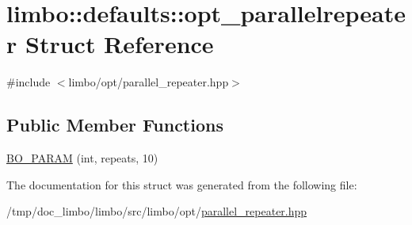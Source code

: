 \hypertarget{structlimbo_1_1defaults_1_1opt__parallelrepeater}{}\section{limbo\+:\+:defaults\+:\+:opt\+\_\+parallelrepeater Struct Reference}
\label{structlimbo_1_1defaults_1_1opt__parallelrepeater}


{\ttfamily \#include $<$limbo/opt/parallel\+\_\+repeater.\+hpp$>$}

\subsection*{Public Member Functions}
\begin{DoxyCompactItemize}
\item 
\hyperlink{group__opt__defaults_ga4dfaebabf04a129cbb565807ed31f2de}{B\+O\+\_\+\+P\+A\+R\+AM} (int, repeats, 10)
\end{DoxyCompactItemize}


The documentation for this struct was generated from the following file\+:\begin{DoxyCompactItemize}
\item 
/tmp/doc\+\_\+limbo/limbo/src/limbo/opt/\hyperlink{parallel__repeater_8hpp}{parallel\+\_\+repeater.\+hpp}\end{DoxyCompactItemize}
